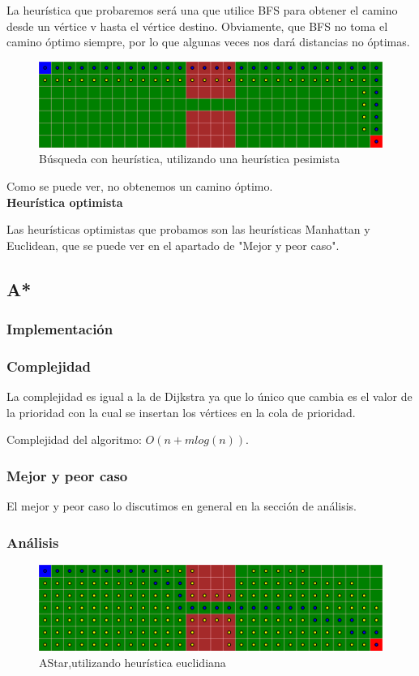 La heurística que probaremos será una que utilice BFS para obtener el camino desde un vértice v hasta el vértice destino. Obviamente, que BFS no toma el camino óptimo siempre, por lo que algunas veces nos dará distancias no óptimas.

\begin{figure}[H]
\centering
\includegraphics[width=\textwidth]{BestSearch/grafo1HeuristicaPesimista.png}
\caption{Búsqueda con heurística, utilizando una heurística pesimista}
\end{figure}
Como se puede ver, no obtenemos un camino óptimo.
\\

\textbf{Heurística optimista}

Las heurísticas optimistas que probamos son las heurísticas Manhattan y Euclidean, que se puede ver en el apartado de "Mejor y peor caso".
\newpage

\subsection{A*}
\subsubsection{Implementación}

\subsubsection{Complejidad}
La complejidad es igual a la de Dijkstra ya que lo único que cambia es el valor de la prioridad con la cual se insertan los vértices en la cola de prioridad.

Complejidad del algoritmo: $O(n + mlog(n))$.

\subsubsection{Mejor y peor caso}
El mejor y peor caso lo discutimos en general en la sección de análisis.
\subsubsection{Análisis}
\begin{figure}[H]
\centering
\includegraphics[width=\textwidth]{AStar/grafo1HeuristicaEuclidean.png}
\caption{AStar,utilizando heurística euclidiana}
\end{figure}


